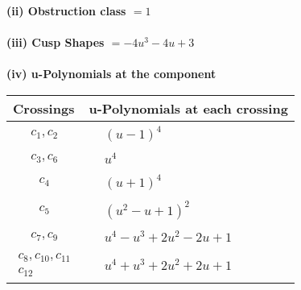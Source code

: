 \documentclass[1p]{elsarticle_modified}
\theoremstyle{definition}
\begin{document}
\flushleft \textbf{(ii) Obstruction class $= 1$}\\~\\
\flushleft \textbf{(iii) Cusp Shapes $= -4 u^3-4 u+3$}\\~\\
\newpage\renewcommand{\arraystretch}{1}
\flushleft \textbf{(iv) u-Polynomials at the component}\newline \\
\begin{tabular}{m{50pt}|m{274pt}}
Crossings & \hspace{64pt}u-Polynomials at each crossing \\
\hline $$\begin{aligned}c_{1},c_{2}\end{aligned}$$&$\begin{aligned}
&(u-1)^4
\end{aligned}$\\
\hline $$\begin{aligned}c_{3},c_{6}\end{aligned}$$&$\begin{aligned}
&u^4
\end{aligned}$\\
\hline $$\begin{aligned}c_{4}\end{aligned}$$&$\begin{aligned}
&(u+1)^4
\end{aligned}$\\
\hline $$\begin{aligned}c_{5}\end{aligned}$$&$\begin{aligned}
&(u^2- u+1)^2
\end{aligned}$\\
\hline $$\begin{aligned}c_{7},c_{9}\end{aligned}$$&$\begin{aligned}
&u^4- u^3+2 u^2-2 u+1
\end{aligned}$\\
\hline $$\begin{aligned}c_{8},c_{10},c_{11}\\c_{12}\end{aligned}$$&$\begin{aligned}
&u^4+u^3+2 u^2+2 u+1
\end{aligned}$\\
\hline
\end{tabular}\\~\\
\end{document}

